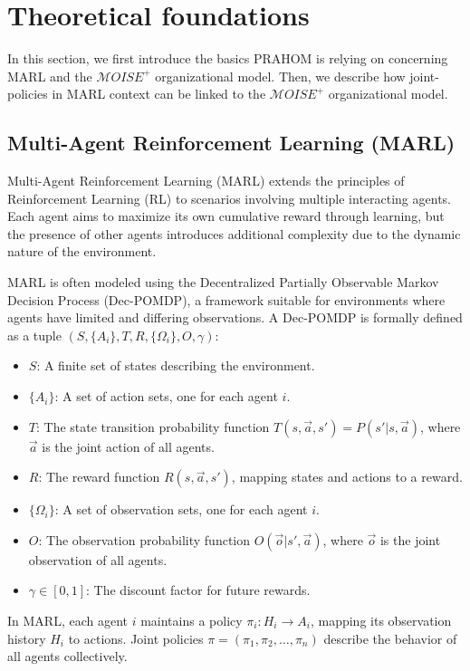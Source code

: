 \documentclass[conference]{IEEEtran}
\begin{document}
\section{Theoretical foundations}

In this section, we first introduce the basics PRAHOM is relying on concerning MARL and the $\mathcal{M}OISE^{+}$ organizational model. Then, we  describe how joint-policies in MARL context can be linked to the $\mathcal{M}OISE^{+}$ organizational model.

\subsection{Multi-Agent Reinforcement Learning (MARL)}

Multi-Agent Reinforcement Learning (MARL) extends the principles of Reinforcement Learning (RL) to scenarios involving multiple interacting agents. Each agent aims to maximize its own cumulative reward through learning, but the presence of other agents introduces additional complexity due to the dynamic nature of the environment.

MARL is often modeled using the Decentralized Partially Observable Markov Decision Process (Dec-POMDP), a framework suitable for environments where agents have limited and differing observations. A Dec-POMDP is formally defined as a tuple $(S, \{A_i\}, T, R, \{\Omega_i\}, O, \gamma)$:

\begin{itemize}
    \item $S$: A finite set of states describing the environment.
    \item $\{A_i\}$: A set of action sets, one for each agent $i$.
    \item $T$: The state transition probability function $T(s, \vec{a}, s') = P(s'|s, \vec{a})$, where $\vec{a}$ is the joint action of all agents.
    \item $R$: The reward function $R(s, \vec{a}, s')$, mapping states and actions to a reward.
    \item $\{\Omega_i\}$: A set of observation sets, one for each agent $i$.
    \item $O$: The observation probability function $O(\vec{o} | s', \vec{a})$, where $\vec{o}$ is the joint observation of all agents.
    \item $\gamma \in [0,1]$: The discount factor for future rewards.
\end{itemize}

In MARL, each agent $i$ maintains a policy $\pi_i: H_i \rightarrow A_i$, mapping its observation history $H_i$ to actions. Joint policies $\pi = (\pi_1, \pi_2, \ldots, \pi_n)$ describe the behavior of all agents collectively.
\end{document}

